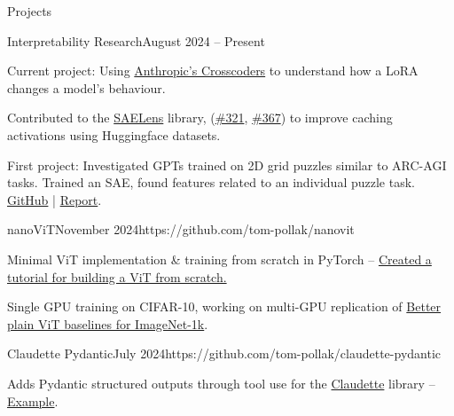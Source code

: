 \documentclass{structure}
\begin{document}
\begin{rSection}{Projects}

    \begin{rSubsection}{Interpretability Research}{August 2024 -- Present}{}{}{}{}

        \item Current project: Using \href{https://transformer-circuits.pub/2024/crosscoders/index.html}{Anthropic's Crosscoders} to understand how a LoRA changes a model's behaviour.

        \item Contributed to the \href{https://github.com/jbloomAus/SAELens}{SAELens} library, (\href{https://github.com/jbloomAus/SAELens/pull/321}{\#321}, \href{https://github.com/jbloomAus/SAELens/pull/367}{\#367}) to improve caching activations using Huggingface datasets.

        \item First project: Investigated GPTs trained on 2D grid puzzles similar to ARC-AGI tasks. Trained an SAE, found features related to an individual puzzle task. \href{https://github.com/tom-pollak/interpretability-culture}{GitHub} \hspace{1mm} | \hspace{1mm} \href{https://docs.google.com/document/d/1km2m3oWZMDrekV9_mYHft5pX9PjrM4imKGEdK9vVMr8/edit?usp=sharing}{Report}.

    \end{rSubsection}

    \begin{rSubsection}{nanoViT}{November 2024}{}{}{https://github.com/tom-pollak/nanovit}{}
        \item Minimal ViT implementation \& training from scratch in PyTorch -- {\color{blue}\href{https://colab.research.google.com/github/tom-pollak/nanoViT/blob/main/tutorials/vit_from_scratch.ipynb}{Created a tutorial for building a ViT from scratch.}}

        \item Single GPU training on CIFAR-10, working on multi-GPU replication of \href{https://arxiv.org/abs/2205.01580}{Better plain ViT baselines for ImageNet-1k}.

    \end{rSubsection}

    \begin{rSubsection}{Claudette Pydantic}{July 2024}{}{}{https://github.com/tom-pollak/claudette-pydantic}{}
        \item Adds Pydantic structured outputs through tool use for the \href{https://github.com/AnswerDotAI/claudette}{Claudette} library -- {\color{blue}\href{https://nbviewer.org/github/tom-pollak/claudette-pydantic/blob/main/nbs/examples/pet_store.ipynb}{Example}}.
    \end{rSubsection}


\end{rSection}
\end{document}
